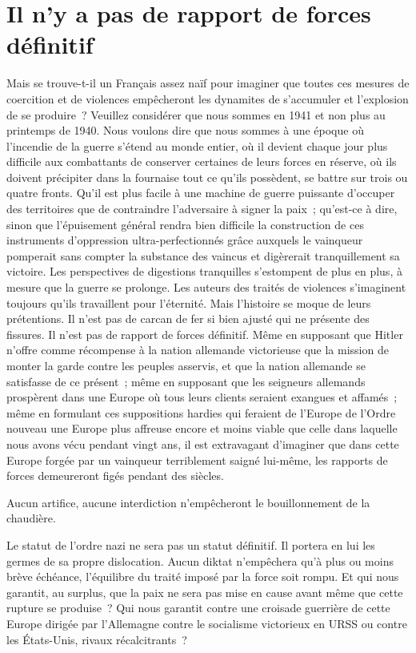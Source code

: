 \documentclass[french,twoside]{book} %
\begin{document}
\section[{Il n’y a pas de rapport de forces définitif}]{Il n’y a pas de rapport de forces définitif}
\noindent Mais se trouve-t-il un Français assez naïf pour imaginer que toutes ces mesures de coercition et de violences empêcheront les dynamites de s’accumuler et l’explosion de se produire ? Veuillez considérer que nous sommes en 1941 et non plus au printemps de 1940. Nous voulons dire que nous sommes à une époque où l’incendie de la guerre s’étend au monde entier, où il devient chaque jour plus difficile aux combattants de conserver certaines de leurs forces en réserve, où ils doivent précipiter dans la fournaise tout ce qu’ils possèdent, se battre sur trois ou quatre fronts. Qu’il est plus facile à une machine de guerre puissante d’occuper des territoires que de contraindre l’adversaire à signer la paix ; qu’est-ce à dire, sinon que l’épuisement général rendra bien difficile la construction de ces instruments d’oppression ultra-perfectionnés grâce auxquels le vainqueur pomperait sans compter la substance des vaincus et digèrerait tranquillement sa victoire. Les perspectives de digestions tranquilles s’estompent de plus en plus, à mesure que la guerre se prolonge. Les auteurs des traités de violences s’imaginent toujours qu’ils travaillent pour l’éternité. Mais l’histoire se moque de leurs prétentions. Il n’est pas de carcan de fer si bien ajusté qui ne présente des fissures. Il n’est pas de rapport de forces définitif. Même en supposant que Hitler n’offre comme récompense à la nation allemande victorieuse que la mission de monter la garde contre les peuples asservis, et que la nation allemande se satisfasse de ce présent ; même en supposant que les seigneurs allemands prospèrent dans une Europe où tous leurs clients seraient exangues et affamés ; même en formulant ces suppositions hardies qui feraient de l’Europe de l’Ordre nouveau une Europe plus affreuse encore et moins viable que celle dans laquelle nous avons vécu pendant vingt ans, il est extravagant d’imaginer que dans cette Europe forgée par un vainqueur terriblement saigné lui-même, les rapports de forces demeureront figés pendant des siècles.\par
Aucun artifice, aucune interdiction n’empêcheront le bouillonnement de la chaudière.\par
Le statut de l’ordre nazi ne sera pas un statut définitif. Il portera en lui les germes de sa propre dislocation. Aucun diktat n’empêchera qu’à plus ou moins brève échéance, l’équilibre du traité imposé par la force soit rompu. Et qui nous garantit, au surplus, que la paix ne sera pas mise en cause avant même que cette rupture se produise ? Qui nous garantit contre une croisade guerrière de cette Europe dirigée par l’Allemagne contre le socialisme victorieux en URSS ou contre les États-Unis, rivaux récalcitrants ?\par
\end{document}
